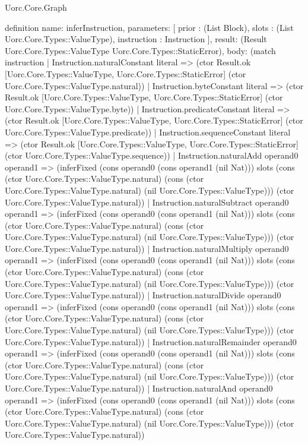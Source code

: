 \begin{lexlean}{Uorc.Core.Graph}
\begin{semanticmodule}
definition{
  name: inferInstruction,
  parameters: [
    prior : (List Block),
    slots : (List Uorc.Core.Types::ValueType),
    instruction : Instruction
  ],
  result: (Result Uorc.Core.Types::ValueType Uorc.Core.Types::StaticError),
  body: (match instruction
    | Instruction.naturalConstant literal => (ctor Result.ok [Uorc.Core.Types::ValueType, Uorc.Core.Types::StaticError] (ctor Uorc.Core.Types::ValueType.natural))
    | Instruction.byteConstant literal => (ctor Result.ok [Uorc.Core.Types::ValueType, Uorc.Core.Types::StaticError] (ctor Uorc.Core.Types::ValueType.byte))
    | Instruction.predicateConstant literal => (ctor Result.ok [Uorc.Core.Types::ValueType, Uorc.Core.Types::StaticError] (ctor Uorc.Core.Types::ValueType.predicate))
    | Instruction.sequenceConstant literal => (ctor Result.ok [Uorc.Core.Types::ValueType, Uorc.Core.Types::StaticError] (ctor Uorc.Core.Types::ValueType.sequence))
    | Instruction.naturalAdd operand0 operand1 => (inferFixed (cons operand0 (cons operand1 (nil Nat))) slots (cons (ctor Uorc.Core.Types::ValueType.natural) (cons (ctor Uorc.Core.Types::ValueType.natural) (nil Uorc.Core.Types::ValueType))) (ctor Uorc.Core.Types::ValueType.natural))
    | Instruction.naturalSubtract operand0 operand1 => (inferFixed (cons operand0 (cons operand1 (nil Nat))) slots (cons (ctor Uorc.Core.Types::ValueType.natural) (cons (ctor Uorc.Core.Types::ValueType.natural) (nil Uorc.Core.Types::ValueType))) (ctor Uorc.Core.Types::ValueType.natural))
    | Instruction.naturalMultiply operand0 operand1 => (inferFixed (cons operand0 (cons operand1 (nil Nat))) slots (cons (ctor Uorc.Core.Types::ValueType.natural) (cons (ctor Uorc.Core.Types::ValueType.natural) (nil Uorc.Core.Types::ValueType))) (ctor Uorc.Core.Types::ValueType.natural))
    | Instruction.naturalDivide operand0 operand1 => (inferFixed (cons operand0 (cons operand1 (nil Nat))) slots (cons (ctor Uorc.Core.Types::ValueType.natural) (cons (ctor Uorc.Core.Types::ValueType.natural) (nil Uorc.Core.Types::ValueType))) (ctor Uorc.Core.Types::ValueType.natural))
    | Instruction.naturalRemainder operand0 operand1 => (inferFixed (cons operand0 (cons operand1 (nil Nat))) slots (cons (ctor Uorc.Core.Types::ValueType.natural) (cons (ctor Uorc.Core.Types::ValueType.natural) (nil Uorc.Core.Types::ValueType))) (ctor Uorc.Core.Types::ValueType.natural))
    | Instruction.naturalAnd operand0 operand1 => (inferFixed (cons operand0 (cons operand1 (nil Nat))) slots (cons (ctor Uorc.Core.Types::ValueType.natural) (cons (ctor Uorc.Core.Types::ValueType.natural) (nil Uorc.Core.Types::ValueType))) (ctor Uorc.Core.Types::ValueType.natural))
}
\end{semanticmodule}
\end{lexlean}
